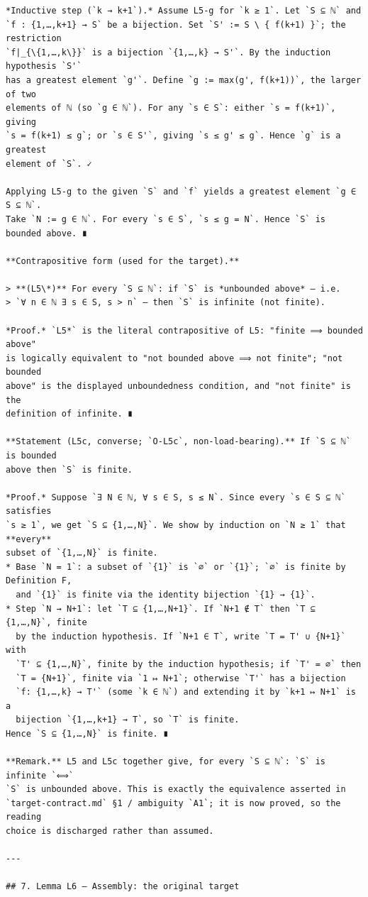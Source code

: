 \documentclass[11pt]{article}
\begin{document}
\begin{verbatim}
*Inductive step (`k → k+1`).* Assume L5-g for `k ≥ 1`. Let `S ⊆ ℕ` and
`f : {1,…,k+1} → S` be a bijection. Set `S' := S \ { f(k+1) }`; the restriction
`f|_{\{1,…,k\}}` is a bijection `{1,…,k} → S'`. By the induction hypothesis `S'`
has a greatest element `g'`. Define `g := max(g', f(k+1))`, the larger of two
elements of ℕ (so `g ∈ ℕ`). For any `s ∈ S`: either `s = f(k+1)`, giving
`s = f(k+1) ≤ g`; or `s ∈ S'`, giving `s ≤ g' ≤ g`. Hence `g` is a greatest
element of `S`. ✓

Applying L5-g to the given `S` and `f` yields a greatest element `g ∈ S ⊆ ℕ`.
Take `N := g ∈ ℕ`. For every `s ∈ S`, `s ≤ g = N`. Hence `S` is bounded above. ∎

**Contrapositive form (used for the target).**

> **(L5\*)** For every `S ⊆ ℕ`: if `S` is *unbounded above* — i.e.
> `∀ n ∈ ℕ ∃ s ∈ S, s > n` — then `S` is infinite (not finite).

*Proof.* `L5*` is the literal contrapositive of L5: "finite ⟹ bounded above"
is logically equivalent to "not bounded above ⟹ not finite"; "not bounded
above" is the displayed unboundedness condition, and "not finite" is the
definition of infinite. ∎

**Statement (L5c, converse; `O-L5c`, non-load-bearing).** If `S ⊆ ℕ` is bounded
above then `S` is finite.

*Proof.* Suppose `∃ N ∈ ℕ, ∀ s ∈ S, s ≤ N`. Since every `s ∈ S ⊆ ℕ` satisfies
`s ≥ 1`, we get `S ⊆ {1,…,N}`. We show by induction on `N ≥ 1` that **every**
subset of `{1,…,N}` is finite.
* Base `N = 1`: a subset of `{1}` is `∅` or `{1}`; `∅` is finite by Definition F,
  and `{1}` is finite via the identity bijection `{1} → {1}`.
* Step `N → N+1`: let `T ⊆ {1,…,N+1}`. If `N+1 ∉ T` then `T ⊆ {1,…,N}`, finite
  by the induction hypothesis. If `N+1 ∈ T`, write `T = T' ∪ {N+1}` with
  `T' ⊆ {1,…,N}`, finite by the induction hypothesis; if `T' = ∅` then
  `T = {N+1}`, finite via `1 ↦ N+1`; otherwise `T'` has a bijection
  `f: {1,…,k} → T'` (some `k ∈ ℕ`) and extending it by `k+1 ↦ N+1` is a
  bijection `{1,…,k+1} → T`, so `T` is finite.
Hence `S ⊆ {1,…,N}` is finite. ∎

**Remark.** L5 and L5c together give, for every `S ⊆ ℕ`: `S` is infinite `⟺`
`S` is unbounded above. This is exactly the equivalence asserted in
`target-contract.md` §1 / ambiguity `A1`; it is now proved, so the reading
choice is discharged rather than assumed.

---

## 7. Lemma L6 — Assembly: the original target


\end{verbatim}
\end{document}
